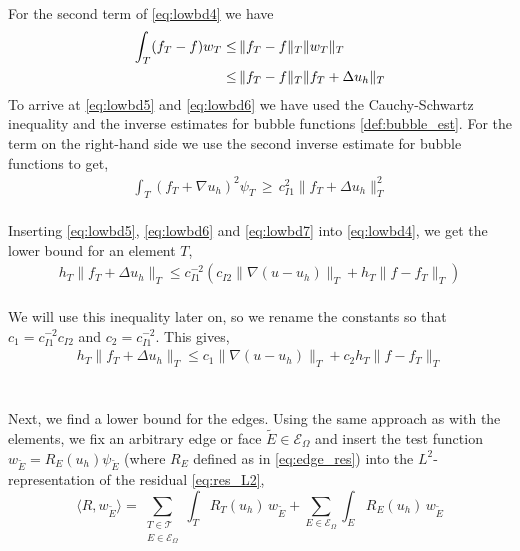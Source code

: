 \\
For the second term of \eqref{eq:lowbd4} we have
\begin{align}\label{eq:lowbd6}
\displaystyle\int_T (f_T-f) w_T \leq & \, \| f_T-f\|_T \|w_T\|_T \\
\leq & \, \| f_T-f\|_T \|f_T + \Delta u_h\|_T   \notag
\end{align}
To arrive at \eqref{eq:lowbd5} and \eqref{eq:lowbd6} we have used the Cauchy-Schwartz inequality and the inverse estimates for bubble functions \eqref{def:bubble_est}. For the term on the right-hand side we use the second inverse estimate for bubble functions to get,
\begin{align} \label{eq:lowbd7}
\displaystyle\int_T (f_T+\nabla u_h)^2 \psi_T \, \geq \, c_{I1}^2 \| f_T + \Delta u_h\|_T^2
\end{align}
\\
Inserting \eqref{eq:lowbd5}, \eqref{eq:lowbd6} and \eqref{eq:lowbd7} into \eqref{eq:lowbd4}, we get the lower bound for an element $T$,
\begin{align} \label{eq:llowbd8}
h_T \| f_T + \Delta u_h\|_T \leq c_{I1}^{-2} \left(c_{I2}\|\nabla(u-u_h) \|_T + h_T \|f-f_T\|_T \right)
\end{align}
\\
We will use this inequality later on, so we rename the constants so that $c_1 = c_{I1}^{-2}c_{I2}$ and $c_2 = c_{I1}^{-2}$. This gives, 
\begin{align} \label{eq:low_bd_element}
h_T \| f_T + \Delta u_h\|_T \leq c_1\|\nabla(u-u_h) \|_T + c_2 h_T \|f-f_T\|_T
\end{align}
\\
\\
Next, we find a lower bound for the edges. Using the same approach as with the elements, we fix an arbitrary edge or face $\tilde{E} \in \mathcal{E}_\Omega$ and insert the test function $w_{\tilde{E}} = R_E(u_h)\psi_{\tilde{E}}$ (where $R_E$ defined as in \eqref{eq:edge_res}) into the $L^2$-representation of the residual \eqref{eq:res_L2},
\begin{equation} \label{eq:lowbdedge1}
\langle R, w_{\tilde{E}} \rangle =  \displaystyle\sum_{\substack{T \in \mathcal{T} \\ E \in \mathcal{E}_\Omega}} \int_T R_T(u_h)\, w_{\tilde{E}}  + \sum_{E \in \mathcal{E}_\Omega} \int_E R_E(u_h) \, w_{\tilde{E}} 
\end{equation}
\\
\\
